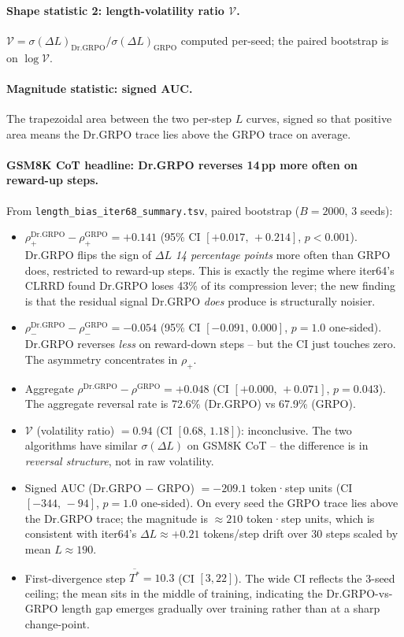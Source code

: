 \documentclass{article}
\begin{document}
\paragraph{Shape statistic 2: length-volatility ratio $\mathcal{V}$.}
$\mathcal{V} = \sigma(\Delta L)_\mathrm{Dr.GRPO} / \sigma(\Delta L)_\mathrm{GRPO}$
computed per-seed; the paired bootstrap is on $\log \mathcal{V}$.

\paragraph{Magnitude statistic: signed AUC.}
The trapezoidal area between the two per-step $L$ curves, signed so that
positive area means the Dr.GRPO trace lies above the GRPO trace on
average.

\paragraph{GSM8K CoT headline: Dr.GRPO reverses 14\,pp more often on reward-up steps.}
From \texttt{length\_bias\_iter68\_summary.tsv}, paired bootstrap
($B=2000$, $3$ seeds):
\begin{itemize}
\item $\rho_{+}^{\mathrm{Dr.GRPO}} - \rho_{+}^{\mathrm{GRPO}} = +0.141$
      (95\% CI $[+0.017,\,+0.214]$, $p < 0.001$). Dr.GRPO flips the
      sign of $\Delta L$ \emph{14 percentage points} more often than
      GRPO does, restricted to reward-up steps. This is exactly the
      regime where iter64's CLRRD found Dr.GRPO loses 43\% of its
      compression lever; the new finding is that the residual signal
      Dr.GRPO \emph{does} produce is structurally noisier.
\item $\rho_{-}^{\mathrm{Dr.GRPO}} - \rho_{-}^{\mathrm{GRPO}} = -0.054$
      (95\% CI $[-0.091,\, 0.000]$, $p = 1.0$ one-sided). Dr.GRPO
      reverses \emph{less} on reward-down steps -- but the CI just
      touches zero. The asymmetry concentrates in $\rho_{+}$.
\item Aggregate $\rho^{\mathrm{Dr.GRPO}} - \rho^{\mathrm{GRPO}} = +0.048$
      (CI $[+0.000,\, +0.071]$, $p = 0.043$). The aggregate reversal
      rate is 72.6\% (Dr.GRPO) vs 67.9\% (GRPO).
\item $\mathcal{V}$ (volatility ratio) $= 0.94$ (CI $[0.68,\, 1.18]$):
      inconclusive. The two algorithms have similar $\sigma(\Delta L)$
      on GSM8K CoT -- the difference is in \emph{reversal structure},
      not in raw volatility.
\item Signed AUC (Dr.GRPO $-$ GRPO) $= -209.1$ token·step units
      (CI $[-344,\, -94]$, $p = 1.0$ one-sided). On every seed the
      GRPO trace lies above the Dr.GRPO trace; the magnitude is
      $\approx 210$ token·step units, which is consistent with
      iter64's $\Delta L \approx +0.21$ tokens/step drift over 30
      steps scaled by mean $L \approx 190$.
\item First-divergence step $\overline{T^*} = 10.3$ (CI $[3, 22]$).
      The wide CI reflects the 3-seed ceiling; the mean sits in the
      middle of training, indicating the Dr.GRPO-vs-GRPO length gap
      emerges gradually over training rather than at a sharp
      change-point.
\end{itemize}
\end{document}
